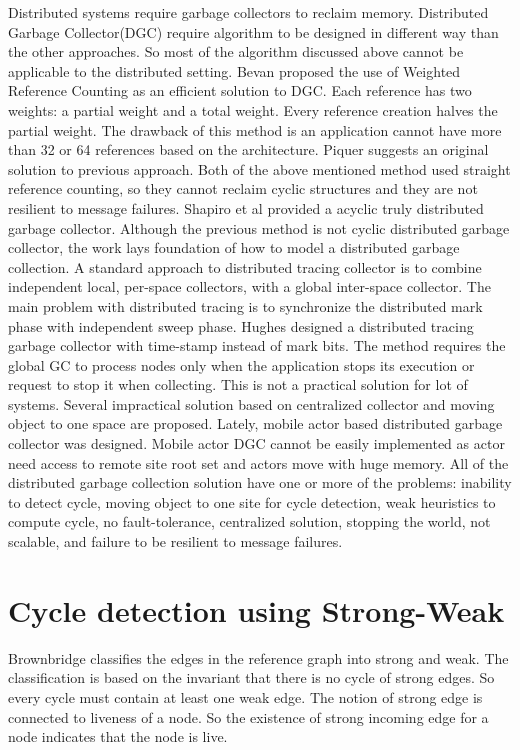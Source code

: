 Distributed systems require garbage collectors to reclaim memory. Distributed Garbage Collector(DGC) require algorithm to be designed in different way than the other approaches. So most of the algorithm discussed above cannot be applicable to the distributed setting. Bevan\cite{Bevan87} proposed the use of Weighted Reference Counting as an efficient solution to DGC. Each reference has two weights: a partial weight and a total weight. Every reference creation halves the partial weight. The drawback of this method is an application cannot have more than 32 or 64 references based on the architecture. Piquer\cite{piquer91} suggests an original solution to previous approach. Both of the above mentioned method used straight reference counting, so they cannot reclaim cyclic structures and they are not resilient to message failures. Shapiro et al \cite{Shapiro92} provided a acyclic truly distributed garbage collector. Although the previous method is not cyclic distributed garbage collector, the work lays foundation of how to model a  distributed garbage collection. A standard approach to distributed tracing collector is to combine independent local, per-space collectors, with a global inter-space collector. The main problem with distributed tracing is to synchronize the distributed mark phase with independent sweep phase\cite{plain95}. Hughes designed a distributed tracing garbage collector with  time-stamp instead of mark bits\cite{hugh85}. The method requires the global GC to process nodes only when the application stops its execution or request to stop it when collecting. This is not a practical solution for lot of systems. Several impractical solution based on centralized collector and moving object to one space are proposed\cite{Maheshwari1997,Maheshwari1997b,Liskov,ladin,Veiga05}. Lately, mobile actor based distributed garbage collector was designed\cite{want}. Mobile actor DGC cannot be easily implemented as actor need access to remote site root set and actors move with huge memory.  All of the distributed garbage collection solution have one or more of the problems: inability to detect cycle, moving object to one site for cycle detection, weak heuristics to compute cycle, no fault-tolerance, centralized solution, stopping the world, not scalable, and failure to be resilient to message failures.


\section{Cycle detection using Strong-Weak}
Brownbridge classifies the edges in the reference graph into strong and weak. The classification is based on the invariant that there is no cycle of strong edges. So every cycle must contain at least one weak edge. The notion of strong edge is connected to liveness of a node. So  the existence of strong incoming edge for a node indicates that the node is live. 

